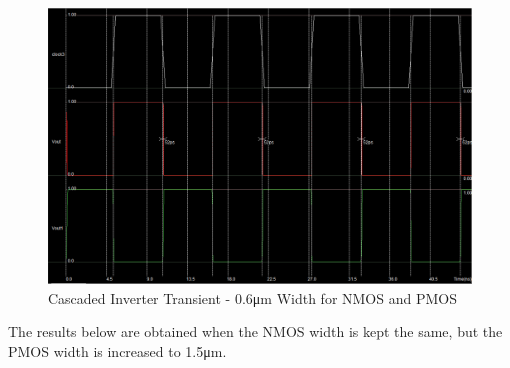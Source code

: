 \FloatBarrier

\FloatBarrier

\begin{figure}[h!]
	\centering
	\includegraphics[scale=0.50]{./images/cascaded_inverter_transient_06nmos06pmos.PNG}
	\caption{Cascaded Inverter Transient - 0.6\si{\micro\meter} Width for NMOS and PMOS}
	\label{fig:cascaded_inverter_transient_06nmos06pmos}
\end{figure}

\FloatBarrier

The results below are obtained when the NMOS width is kept the same, but the PMOS width is increased to 1.5\si{\micro\meter}.

\FloatBarrier

